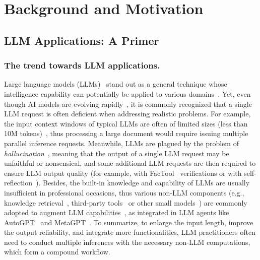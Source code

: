 \section{Background and Motivation}
\label{sec:background}

\subsection{LLM Applications: A Primer}
\label{sec:applications}

\subsubsection{The trend towards LLM applications.} 
Large language models (LLMs)~\cite{brown2020language,floridi2020gpt,touvron2023llama} stand out as a general technique whose intelligence capability can potentially be applied to various domains~\cite{dosovitskiy2020image,hadi2023survey}. 
Yet, even though AI models are evolving rapidly~\cite{sonoda2024diagnostic,reid2024gemini}, it is commonly recognized that a single LLM request is often deficient when addressing realistic problems. 
For example, the input context windows of typical LLMs are often of limited sizes (less than 10M tokens)~\cite{chen2023extending,lin2024infinite}, thus processing a large document would require issuing multiple parallel inference requests. 
Meanwhile, LLMs are plagued by the problem of \emph{hallucination}~\cite{ji2023survey}, meaning that the output of a single LLM request may be unfaithful or nonsensical, and some additional LLM requests are then required to ensure LLM output quality (for example, with FacTool~\cite{chern2023factool} verifications or with self-reflection~\cite{ji2023towards}).
Besides, the built-in knowledge and capability of LLMs are usually insufficient in professional occasions, thus various non-LLM components (e.g., knowledge retrieval~\cite{lewis2020retrieval}, third-party tools~\cite{shen2024llm} or other small models~\cite{shen2024hugginggpt}) are commonly adopted to augment LLM capabilities~\cite{abhyankarinfercept}, as 
integrated in LLM agents like AutoGPT~\cite{fezari2023gpt} and MetaGPT~\cite{hong2023metagpt}. 
To summarize, to enlarge the input length, improve the output reliability, and integrate more functionalities, LLM practitioners often need to conduct multiple inferences with the necessary non-LLM computations, which form a compound workflow.

